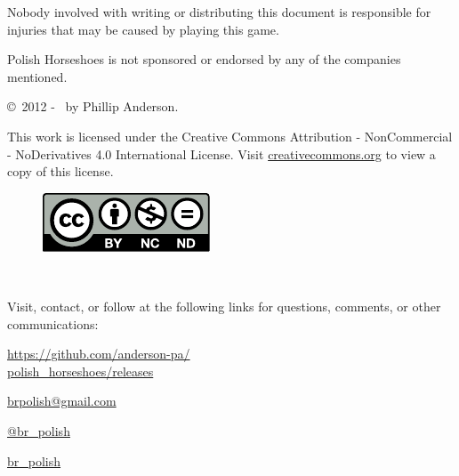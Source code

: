 \documentclass[11pt,letterpaper,twocolumn,english,DIV=calc]{scrartcl}
\begin{document}

Nobody involved with writing or distributing this document is responsible for injuries that may be caused by playing this game.

\medskip{}\noindent Polish Horseshoes is not sponsored or endorsed by any of the companies mentioned.


\copyright\ 2012 - \the\year\ by Phillip Anderson. 

\noindent This work is licensed under the Creative Commons Attribution
- NonCommercial - NoDerivatives 4.0 International License. 
Visit \href{http://creativecommons.org/licenses/by-nc-nd/4.0/}{creativecommons.org} to view a copy of this license.

\begin{figure}[!ht]
	\includegraphics[width=\columnwidth]{images/by-nc-nd}
\end{figure}

\newpage{}

\ \vfill{}

\noindent Visit, contact, or follow at the following links for questions, comments, or other communications:

\begin{description}[listparindent=1.cm, font=\normalfont]
	\item[{\faGlobe}] \href{https://github.com/anderson-pa/polish_horseshoes/releases}{https://github.com/anderson-pa/\\\indent polish\_horseshoes/releases}

	\item[\faEnvelopeO] \href{mailto:brpolish@gmail.com}{brpolish@gmail.com}

	\item[\faTwitter] \href{http://www.twitter.com/br_polish}{@br\_{}polish}

	\item[\faTwitch] \href{http://www.twitch.tv/br_polish}{br\_{}polish}
\end{description}
\end{document}
